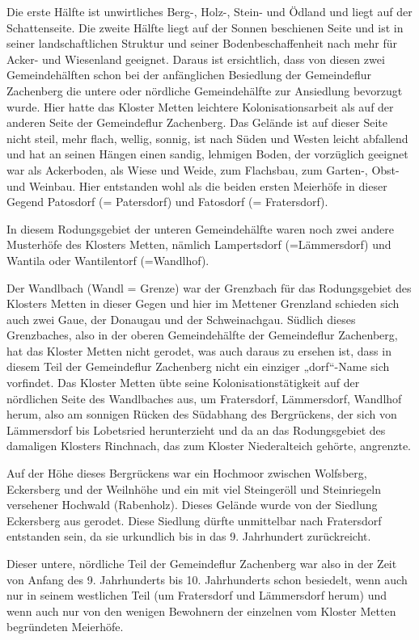 \documentclass{book}
\begin{document}
Die erste Hälfte ist unwirtliches Berg-, Holz-, Stein- und Ödland und liegt auf
der Schattenseite. Die zweite Hälfte liegt auf der Sonnen beschienen Seite und
ist in seiner landschaftlichen Struktur und seiner Bodenbeschaffenheit nach mehr
für Acker- und Wiesenland geeignet. Daraus ist ersichtlich, dass von diesen zwei
Gemeindehälften schon bei der anfänglichen Besiedlung der Gemeindeflur
Zachenberg die untere oder nördliche Gemeindehälfte zur Ansiedlung bevorzugt
wurde. Hier hatte das Kloster Metten leichtere Kolonisationsarbeit als auf der
anderen Seite der Gemeindeflur Zachenberg. Das Gelände ist auf dieser Seite
nicht steil, mehr flach, wellig, sonnig, ist nach Süden und Westen leicht
abfallend und hat an seinen Hängen einen sandig, lehmigen Boden, der vorzüglich
geeignet war als Ackerboden, als Wiese und Weide, zum Flachsbau, zum Garten-,
Obst- und Weinbau. Hier entstanden wohl als die beiden ersten Meierhöfe in
dieser Gegend Patosdorf (= Patersdorf) und Fatosdorf (= Fratersdorf).

In diesem Rodungsgebiet der unteren Gemeindehälfte waren noch zwei andere
Musterhöfe des Klosters Metten, nämlich Lampertsdorf (=Lämmersdorf) und Wantila
oder Wantilentorf (=Wandlhof).

Der Wandlbach (Wandl = Grenze) war der Grenzbach für das Rodungsgebiet des
Klosters Metten in dieser Gegen und hier im Mettener Grenzland schieden sich
auch zwei Gaue, der Donaugau und der Schweinachgau. Südlich dieses Grenzbaches,
also in der oberen Gemeindehälfte der Gemeindeflur Zachenberg, hat das Kloster
Metten nicht gerodet, was auch daraus zu ersehen ist, dass in diesem Teil der
Gemeindeflur Zachenberg nicht ein einziger „dorf“-Name sich vorfindet. Das
Kloster Metten übte seine Kolonisationstätigkeit auf der nördlichen Seite des
Wandlbaches aus, um Fratersdorf, Lämmersdorf, Wandlhof herum, also am sonnigen
Rücken des Südabhang des Bergrückens, der sich von Lämmersdorf bis Lobetsried
herunterzieht und da an das Rodungsgebiet des damaligen Klosters Rinchnach, das
zum Kloster Niederalteich gehörte, angrenzte.

Auf der Höhe dieses Bergrückens war ein Hochmoor zwischen Wolfsberg, Eckersberg
und der Weilnhöhe und ein mit viel Steingeröll und Steinriegeln versehener
Hochwald (Rabenholz). Dieses Gelände wurde von der Siedlung Eckersberg aus
gerodet. Diese Siedlung dürfte unmittelbar nach Fratersdorf entstanden sein, da
sie urkundlich bis in das 9. Jahrhundert zurückreicht.

Dieser untere, nördliche Teil der Gemeindeflur Zachenberg war also in der Zeit
von Anfang des 9. Jahrhunderts bis 10. Jahrhunderts schon besiedelt, wenn auch
nur in seinem westlichen Teil (um Fratersdorf und  Lämmersdorf herum) und wenn
auch nur von den wenigen Bewohnern der einzelnen vom Kloster Metten begründeten
Meierhöfe.
\end{document}
